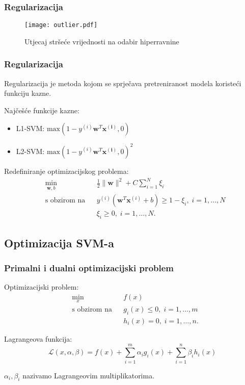\documentclass[utf8]{beamer}
\begin{document}
\begin{frame}
\frametitle{Regularizacija}
\begin{figure}
\texttt{[image: outlier.pdf]}
\caption{Utjecaj stršeće vrijednosti na odabir hiperravnine}
\end{figure}
\end{frame}

\begin{frame}
\frametitle{Regularizacija}
\alert{Regularizacija} je metoda kojom se sprječava pretreniranost modela koristeći funkciju kazne. 

\vspace{\baselineskip}

Najčešće funkcije kazne:
\begin{itemize}
\item L1-SVM: $\text{max}(1 - y^{(i)}\mathbf{w}^T\mathbf{x^{(i)}}, 0)$
\item L2-SVM: $\text{max}(1 - y^{(i)}\mathbf{w}^T\mathbf{x^{(i)}}, 0)^2$
\end{itemize}

\begin{block}{Redefiniranje optimizacijskog problema:}
\begin{equation*}
\begin{aligned}
& \underset{\mathbf{w}, b}{\text{min}}
& & \frac{1}{2}\|\mathbf{w}\|^2 + C\sum_{i=1}^{N} \xi_i\\
& \text{s obzirom na}
& & y^{(i)}(\mathbf{w}^T\mathbf{x}^{(i)} + b) \geq 1 - \xi_i, \; i = 1, \ldots, N \\
&&& \xi_i \geq 0, \; i = 1, \ldots, N.
\end{aligned}
\end{equation*}
\end{block}
\end{frame}

\subsection{Optimizacija SVM-a}

\begin{frame}
\frametitle{Primalni i dualni optimizacijski problem}
Optimizacijski problem:
\begin{equation*}
\begin{aligned}
& \underset{x}{\text{min}}
& & f(x)\\
& \text{s obzirom na}
& & g_i(x) \leq 0, \; i = 1, \ldots, m \\
&&& h_i(x) = 0, \; i = 1, \ldots, n.
\end{aligned}
\end{equation*}

Lagrangeova funkcija:
\begin{equation*}
\mathcal{L}(x, \alpha, \beta) = f(x) + \sum_{i=1}^{m}\alpha_ig_i(x) + \sum_{i=1}^{n}\beta_ih_i(x)
\end{equation*}

$\alpha_i, \beta_i$ nazivamo \alert{Lagrangeovim multiplikatorima}.
\end{frame}
\end{document}
